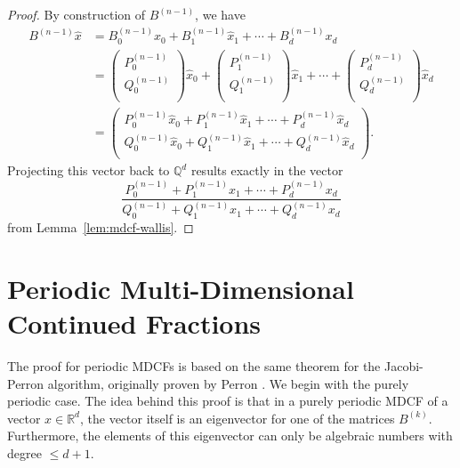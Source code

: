 \begin{proof}
  By construction of $B^{(n-1)}$, we have
  \begin{align*}
    B^{(n-1)} \hat x
    & = B_0^{(n-1)} \hat x_0 + B_1^{(n-1)} \hat x_1 + ⋯ + B_d^{(n-1)} x_d \\
    & =
    \begin{pmatrix}
      P_0^{(n-1)} \\
      Q_0^{(n-1)} \\
    \end{pmatrix} \hat x_0
    + \begin{pmatrix}
      P_1^{(n-1)} \\
      Q_1^{(n-1)} \\
    \end{pmatrix} \hat x_1
    + ⋯ + \begin{pmatrix}
      P_d^{(n-1)} \\
      Q_d^{(n-1)} \\
    \end{pmatrix} \hat x_d \\
    & = \begin{pmatrix}
      P_0^{(n-1)} \hat x_0 + P_1^{(n-1)} \hat x_1 + ⋯ + P_d^{(n-1)} \hat x_d \\
      Q_0^{(n-1)} \hat x_0 + Q_1^{(n-1)} \hat x_1 + ⋯ + Q_d^{(n-1)} \hat x_d \\
    \end{pmatrix}.
  \end{align*}
  Projecting this vector back to $ℚ^d$ results exactly in the vector
  \[
    \frac{P_0^{(n-1)} + P_1^{(n-1)} x_1 + ⋯ + P_d^{(n-1)} x_d}{Q_0^{(n-1)} + Q_1^{(n-1)} x_1 + ⋯ + Q_d^{(n-1)} x_d}
  \]
  from
  Lemma~\ref{lem:mdcf-wallis}.
\end{proof}

\section{Periodic Multi-Dimensional Continued Fractions}

The proof for periodic MDCFs is based on the same theorem for the Jacobi-Perron
algorithm, originally proven by Perron \cite{Perron07}.
We begin with the purely periodic case.
The idea behind this proof is that in a purely periodic MDCF of a vector $x ∈ ℝ^d$,
the vector itself is an eigenvector for one of the matrices $B^{(k)}$.
Furthermore, the elements of this eigenvector can only be algebraic numbers with degree $≤ d+1$.

